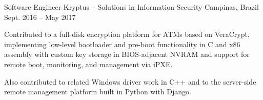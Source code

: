 \begin{cventries}
 
  \cventry
    {Software Engineer}
    {Kryptus -- Solutions in Information Security}
    {Campinas, Brazil}
    {Sept. 2016 -- May 2017}
    {
      \begin{cvitems}
        \item {Contributed to a full-disk encryption platform for ATMs based on VeraCrypt, implementing low-level bootloader and pre-boot functionality in C and x86 assembly with custom key storage in BIOS-adjacent NVRAM and support for remote boot, monitoring, and management via iPXE.}
        \item {Also contributed to related Windows driver work in C++ and to the server-side remote management platform built in Python with Django.}
      \end{cvitems}
    }



\end{cventries}
